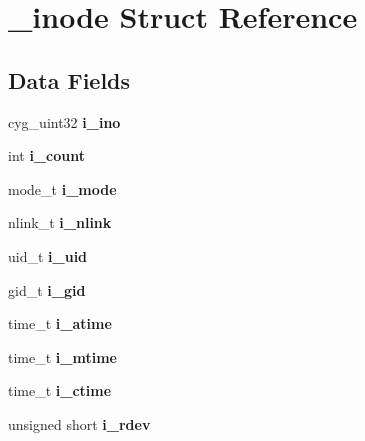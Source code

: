 \hypertarget{struct__inode}{}\section{\+\_\+inode Struct Reference}
\label{struct__inode}
\subsection*{Data Fields}
\begin{DoxyCompactItemize}
\item 
\mbox{\label{struct__inode_ae73b754354e480d07e3e3b4c19f6f171}} 
cyg\+\_\+uint32 {\bfseries i\+\_\+ino}
\item 
\mbox{\label{struct__inode_acfc6fc22f9a58c5f46c20f4e234d1695}} 
int {\bfseries i\+\_\+count}
\item 
\mbox{\label{struct__inode_abdefd803a10188e4aeb712fd64c7f1ac}} 
mode\+\_\+t {\bfseries i\+\_\+mode}
\item 
\mbox{\label{struct__inode_a72aa301859d9e8e08144eb49e10f9ffc}} 
nlink\+\_\+t {\bfseries i\+\_\+nlink}
\item 
\mbox{\label{struct__inode_a242b5d30472c58426c5fa8c667eb5fff}} 
uid\+\_\+t {\bfseries i\+\_\+uid}
\item 
\mbox{\label{struct__inode_a873f2738a7ff901a130d5b87215a5f69}} 
gid\+\_\+t {\bfseries i\+\_\+gid}
\item 
\mbox{\label{struct__inode_a7df9f8da27aa78961d66a1435b5af7be}} 
time\+\_\+t {\bfseries i\+\_\+atime}
\item 
\mbox{\label{struct__inode_abf01eef92cb2b28c03d70ce328ca9efb}} 
time\+\_\+t {\bfseries i\+\_\+mtime}
\item 
\mbox{\label{struct__inode_acfcdfdf37c90efdfc2b730f578a941ee}} 
time\+\_\+t {\bfseries i\+\_\+ctime}
\item 
\mbox{\label{struct__inode_a774ecaf61de0a021401f7878118b109f}} 
unsigned short {\bfseries i\+\_\+rdev}

\end{DoxyCompactItemize}
